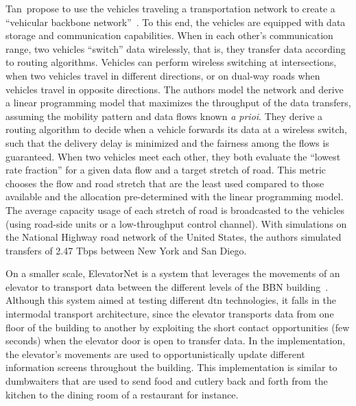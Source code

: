 Tan~\etal propose to use the vehicles traveling a transportation network to create a ``vehicular backbone network''~\cite{tan2014vehicular}. To this end, the vehicles are equipped with data storage and communication capabilities. When in each other's communication range, two vehicles ``switch'' data wirelessly, that is, they transfer data according to routing algorithms. Vehicles can perform wireless switching at intersections, when two vehicles travel in different directions, or on dual-way roads when vehicles travel in opposite directions. The authors model the network and derive a linear programming model that maximizes the throughput of the data transfers, assuming the mobility pattern and data flows known \textit{a prioi}. They derive a routing algorithm to decide when a vehicle forwards its data at a wireless switch, such that the delivery delay is minimized and the fairness among the flows is guaranteed. When two vehicles meet each other, they both evaluate the ``lowest rate fraction'' for a given data flow and a target stretch of road. This metric chooses the flow and road stretch that are the least used compared to those available and the allocation pre-determined with the linear programming model. The average capacity usage of each stretch of road is broadcasted to the vehicles (\eg using road-side units or a low-throughput control channel). With simulations on the National Highway road network of the United States, the authors simulated transfers of 2.47 Tbps between New York and San Diego. 

On a smaller scale, ElevatorNet is a system that leverages the movements of an elevator to transport data between the different levels of the BBN building~\cite{krishnan2007spindle}. Although this system aimed at testing different \acrshort{dtn} technologies, it falls in the intermodal transport architecture, since the elevator transports data from one floor of the building to another by exploiting the short contact opportunities (few seconds) when the elevator door is open to transfer data. In the implementation, the elevator's movements are used to opportunistically update different information screens throughout the building. This implementation is similar to dumbwaiters that are used to send food and cutlery back and forth from the kitchen to the dining room of a restaurant for instance. 

